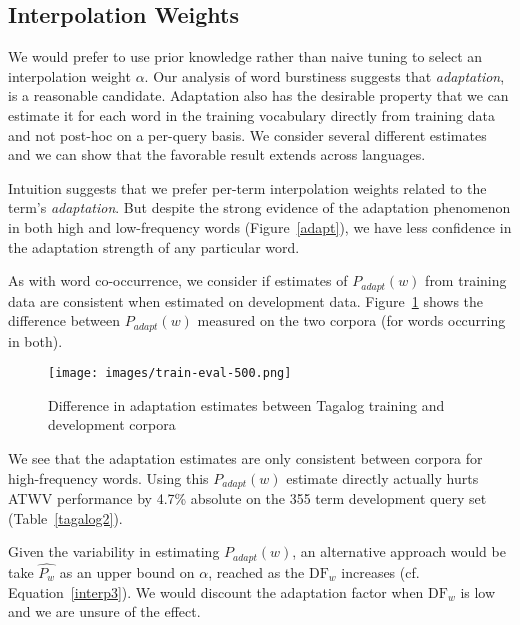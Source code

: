 \documentclass[11pt]{article}
\begin{document}
\subsection{Interpolation Weights}

We would prefer to use prior knowledge rather than naive tuning to select an interpolation weight $\alpha$.  Our analysis of word burstiness suggests that {\em adaptation}, is a reasonable candidate.  Adaptation also has the desirable property that we can estimate it for each word in the training vocabulary directly from training data and not post-hoc on a per-query basis.  We consider several different estimates and we can show that the favorable result extends across languages.

Intuition suggests that we prefer per-term interpolation weights related to the term's {\em adaptation}.  But despite the strong evidence of the adaptation phenomenon in both high and low-frequency words (Figure~\ref{adapt}), we have less confidence in the adaptation strength of any particular word.  

As with word co-occurrence, we consider if estimates of $P_{adapt}(w)$ from training data are consistent when estimated on development data.  Figure~\ref{treval} shows the difference between $P_{adapt}(w)$ measured on the two corpora (for words occurring in both).   

\begin{figure}[h]
\centering
\texttt{[image: images/train-eval-500.png]}
\begin{caption}{Difference in adaptation estimates between Tagalog training and development corpora}
\label{treval}
\end{caption}
\end{figure}


We see that the adaptation estimates are only consistent between corpora for high-frequency words.  Using this $P_{adapt}(w)$ estimate directly actually hurts ATWV performance by 4.7\% absolute on the 355 term development query set (Table~\ref{tagalog2}).

Given the variability in estimating $P_{adapt}(w)$, an alternative approach would be take $\widehat{P_w}$ as an upper bound on $\alpha$, reached as the $\mathrm{DF}_w$ increases (cf. Equation~\ref{interp3}).  We would discount the adaptation factor when $\mathrm{DF}_w$ is low and we are unsure of the effect.
\end{document}
